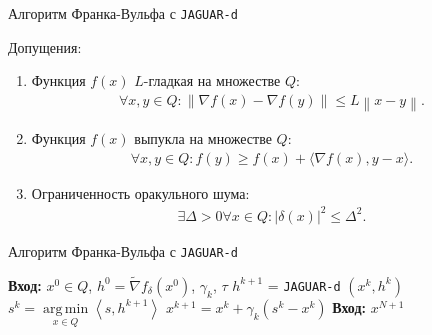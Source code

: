 \documentclass{beamer}
\DeclareMathOperator*{\argmin}{arg\,min}
\begin{document}
\begin{frame}{Алгоритм Франка-Вульфа с \texttt{JAGUAR-d}}

    Допущения:
    \begin{enumerate}
        \item Функция $f(x)$ $L$-гладкая на множестве $Q$: 
            \begin{align*}
                \forall x, y \in Q: \left\| \nabla f(x) - \nabla f(y) \right\| \leq L \left\| x - y \right\|.
            \end{align*}

        \item Функция $f(x)$ выпукла на множестве $Q$:
            \begin{align*}
                \forall x, y \in Q: f(y) \geq f(x) + \langle \nabla f(x), y - x \rangle.
            \end{align*}

        \item Ограниченность оракульного шума:
            \begin{align*}
                \exists \Delta > 0 \forall x \in Q: | \delta(x) |^2 \leq \Delta^2.
            \end{align*}
                
    \end{enumerate}

\end{frame}


\begin{frame}{Алгоритм Франка-Вульфа с \texttt{JAGUAR-d}}

    \begin{algorithm}[H]
        \caption{}
        \begin{algorithmic}[1]
        	\State \textbf{Вход:} $x^0 \in Q$, $h^0 = \widetilde{\nabla} f_\delta (x^0)$, $\gamma_k$, $\tau$
                \State $h^{k + 1}$ = \texttt{JAGUAR-d} $\left( x^k, h^k \right)$
                \State $s^k = \argmin\limits_{x \in Q} \left< s, h^{k + 1} \right>$
                \State $x^{k + 1} = x^k + \gamma_k (s^k - x^k)$
            \EndFor
            \State \textbf{Вход:} $x^{N + 1}$
        \end{algorithmic}
    \end{algorithm}

\end{frame}
\end{document}
